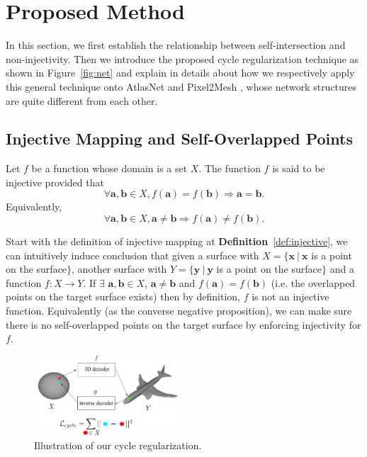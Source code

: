 \section{Proposed Method}
In this section, we first establish the relationship between self-intersection and non-injectivity.  
Then we introduce the proposed cycle regularization technique as shown in Figure~\ref{fig:net} and explain in details about how we respectively apply this general technique onto AtlasNet \cite{atlasnet} and Pixel2Mesh \cite{pixel2mesh}, whose network structures are quite different from each other.

\subsection{Injective Mapping and Self-Overlapped Points}
\begin{m_def}
	\label{def:injective}
	Let $f$ be a function whose domain is a set $X$. The function $f$ is said to be injective provided that
	\begin{equation}
	\forall \mathbf{a},\mathbf{b} \in X, f(\mathbf{a}) = f(\mathbf{b}) \Rightarrow \mathbf{a} = \mathbf{b}.
	\end{equation} 
	Equivalently, 
	\begin{equation}
	\forall \mathbf{a},\mathbf{b} \in X, \mathbf{a} \neq \mathbf{b} \Rightarrow f(\mathbf{a}) \neq f(\mathbf{b}).
	\end{equation}
\end{m_def}
Start with the definition of injective mapping at \textbf{Definition}~\ref{def:injective}, we can intuitively induce conclusion that given a surface with $X =\{\mathbf{x}~|~\mathbf{x}$ is a point on the surface$\} $, another surface with $ Y =\{\mathbf{y}~|~\mathbf{y}$ is a point on the surface$\}$ and a function $f:X \rightarrow Y$. If $\exists$ $ \mathbf{a},\mathbf{b} \in X$, $\mathbf{a} \neq \mathbf{b}$ and $f(\mathbf{a}) = f(\mathbf{b})$ (i.e. the overlapped points on the target surface exists) then by definition, $f$ is not an injective function. Equivalently (as the converse negative proposition), we can make sure there is no self-overlapped points on the target surface by enforcing injectivity for $f$.

\begin{figure}
	\vspace{-20pt}
	\begin{center}
		\includegraphics[width=0.48\textwidth]{img/net/cycle}
	\end{center}
	\caption{Illustration of our cycle regularization.}
	\label{fig:cycle}
\end{figure}
